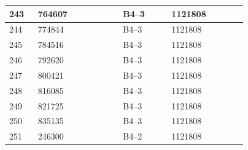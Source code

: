 \documentclass[UTF8,10pt,a4paper,fontset=fandol]{ctexart}
\newcommand{\fieldvalue}[1]{#1}
\begin{document}
\begin{center}
\begin{tabular}{|p{0.08\linewidth}|p{0.28\linewidth}|p{0.16\linewidth}|p{0.25\linewidth}|}
243 &
\fieldvalue{764607} &
\fieldvalue{B4--3} &
\fieldvalue{1121808} & \\ \hline
244 &
\fieldvalue{774844} &
\fieldvalue{B4--3} &
\fieldvalue{1121808} & \\ \hline
245 &
\fieldvalue{784516} &
\fieldvalue{B4--3} &
\fieldvalue{1121808} & \\ \hline
246 &
\fieldvalue{792620} &
\fieldvalue{B4--3} &
\fieldvalue{1121808} & \\ \hline
247 &
\fieldvalue{800421} &
\fieldvalue{B4--3} &
\fieldvalue{1121808} & \\ \hline
248 &
\fieldvalue{816085} &
\fieldvalue{B4--3} &
\fieldvalue{1121808} & \\ \hline
249 &
\fieldvalue{821725} &
\fieldvalue{B4--3} &
\fieldvalue{1121808} & \\ \hline
250 &
\fieldvalue{835135} &
\fieldvalue{B4--3} &
\fieldvalue{1121808} & \\ \hline
251 &
\fieldvalue{246300} &
\fieldvalue{B4--2} &
\fieldvalue{1121808} & \\ \hline
\end{tabular}
\end{center}
\end{document}
